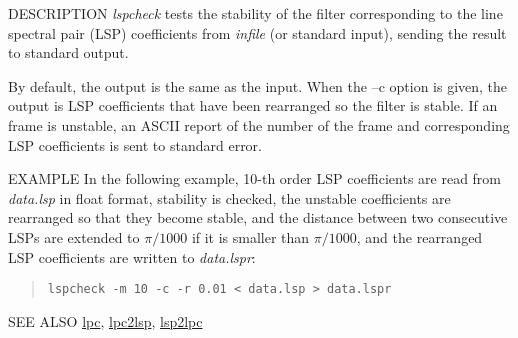\begin{synopsis}
\item [lspcheck] [ --m $M$ ] [ --s $S$ ] [ --k ] [ --i $I$ ] [ --o $O$ ]
		[ --r $R$] [ {\em infile} ] 
\end{synopsis}

\begin{qsection}{DESCRIPTION}
{\em lspcheck} tests the stability of the filter 
corresponding to the line spectral pair (LSP) coefficients 
from {\em infile} (or standard input), 
sending the result to standard output.

By default, the output is the same as the input.
When the --c option is given,
the output is LSP coefficients
that have been rearranged so the filter is stable.
If an frame is unstable, an ASCII report of the number of the frame
 and corresponding LSP coefficients is sent to standard error.
\end{qsection}

\begin{options}
\end{options}

\begin{qsection}{EXAMPLE}
In the following example, 10-th order LSP coefficients are
read from {\em data.lsp} in float format,
stability is checked, the unstable coefficients are rearranged
so that they become stable, and the distance between two
consecutive LSPs are extended to $\pi /1000$ if
 it is smaller than $\pi /1000$, and the
 rearranged LSP coefficients are written to {\em data.lspr}:
\begin{quote}
\verb!lspcheck -m 10 -c -r 0.01 < data.lsp > data.lspr!
\end{quote}
\end{qsection}

\begin{qsection}{SEE ALSO}
\hyperlink{lpc}{lpc},
\hyperlink{lpc2lsp}{lpc2lsp},
\hyperlink{lsp2lpc}{lsp2lpc}
\end{qsection}
